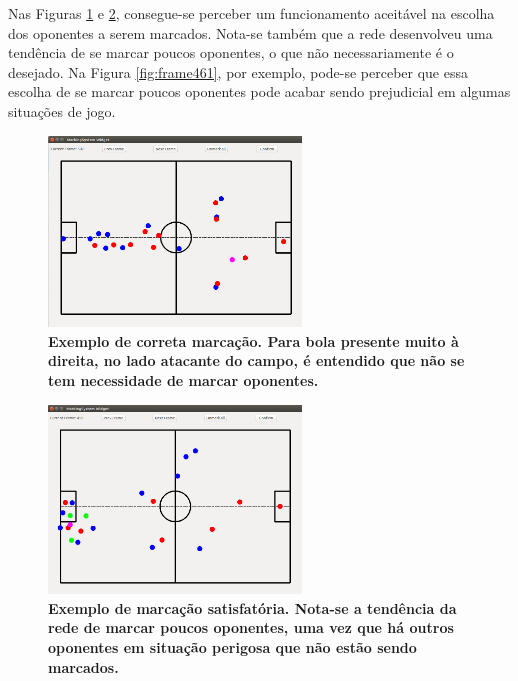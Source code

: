 \documentclass[10pt,fleqn,a4paper]{article}
\begin{document}
	Nas Figuras \ref{fig:frame507} e \ref{fig:frame459}, consegue-se perceber um funcionamento aceitável na escolha dos oponentes a serem marcados. Nota-se também que a rede desenvolveu uma tendência de se marcar poucos oponentes, o que não necessariamente é o desejado. Na Figura \ref{fig:frame461}, por exemplo, pode-se perceber que essa escolha de se marcar poucos oponentes pode acabar sendo prejudicial em algumas situações de jogo.
	
\begin{figure}[H]
	\centering
	\includegraphics[width=0.6\textwidth]{figures/frame507.png}
   \caption{\textbf{Exemplo de correta marcação. Para bola presente muito à direita, no lado atacante do campo, é entendido que não se tem necessidade de marcar oponentes.}} \label{fig:frame507}
\end{figure}

\begin{figure}[H]
	\centering
	\includegraphics[width=0.6\textwidth]{figures/frame459.png}
   \caption{\textbf{Exemplo de marcação satisfatória. Nota-se a tendência da rede de marcar poucos oponentes, uma vez que há outros oponentes em situação perigosa que não estão sendo marcados.}} \label{fig:frame459}
\end{figure}
\end{document}
